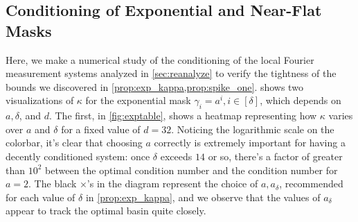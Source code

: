 \subsection{Conditioning of Exponential and Near-Flat Masks}
\label{sec:expl_num}
Here, we make a numerical study of the conditioning of the local Fourier measurement systems analyzed in \cref{sec:reanalyze} to verify the tightness of the bounds we discovered in \cref{prop:exp_kappa,prop:spike_one}.   shows two visualizations of $\kappa$ for the exponential mask $\gamma_i = a^i, i \in [\delta]$, which depends on $a, \delta$, and $d$.  The first, in \cref{fig:exptable}, shows a heatmap representing how $\kappa$ varies over $a$ and $\delta$ for a fixed value of $d = 32$.  Noticing the logarithmic scale on the colorbar, it's clear that choosing $a$ correctly is extremely important for having a decently conditioned system: once $\delta$ exceeds $14$ or so, there's a factor of greater than $10^2$ between the optimal condition number and the condition number for $a = 2$.  The black $\times$'s in the diagram represent the choice of $a, a_\delta$, recommended for each value of $\delta$ in \cref{prop:exp_kappa}, and we observe that the values of $a_\delta$ appear to track the optimal basin quite closely.

